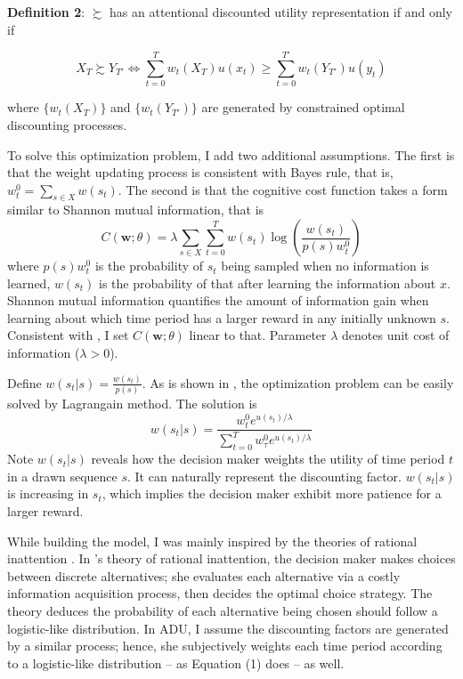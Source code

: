 \documentclass[
  12pt,
]{article}
\begin{document}
\textbf{Definition 2}: \(\succsim\) has an attentional discounted
utility representation if and only if

\[
X_T \succsim Y_{T'} \Longleftrightarrow \sum_{t=0}^{T} w_t(X_T)u(x_t)\geq \sum_{t=0}^{T'} w_t(Y_{T'})u(y_t)
\]

where \(\{w_t(X_T)\}\) and \(\{w_t(Y_{T'})\}\) are generated by
constrained optimal discounting processes.

To solve this optimization problem, I add two additional assumptions.
The first is that the weight updating process is consistent with Bayes
rule, that is, \(w^0_t=\sum_{s\in X} w(s_t)\). The second is that the
cognitive cost function takes a form similar to Shannon mutual
information, that is\[
C(\textbf{w};\theta)= \lambda \sum_{s\in X}\sum_{t=0}^T w(s_t) \log\left(\frac{w(s_t)}{p(s)w_t^0}\right)
\]where \(p(s)w^0_t\) is the probability of \(s_t\) being sampled when
no information is learned, \(w(s_t)\) is the probability of that after
learning the information about \(x\). Shannon mutual information
quantifies the amount of information gain when learning about which time
period has a larger reward in any initially unknown \(s\). Consistent
with \citet{matejka_rational_2015}, I set \(C(\textbf{w};\theta)\)
linear to that. Parameter \(\lambda\) denotes unit cost of information
(\(\lambda>0\)).

Define \(w(s_t|s) = \frac{w(s_t)}{p(s)}\). As is shown in
\citet{matejka_rational_2015}, the optimization problem can be easily
solved by Lagrangain method. The solution is\[ \tag{1}
w(s_t|s) =\frac{w_t^0e^{u(s_t)/\lambda}}{\sum_{t=0}^T w_\tau^0 e^{u(s_t)/\lambda}}
\]Note \(w(s_t|s)\) reveals how the decision maker weights the utility
of time period \(t\) in a drawn sequence \(s\). It can naturally
represent the discounting factor. \(w(s_t|s)\) is increasing in \(s_t\),
which implies the decision maker exhibit more patience for a larger
reward.

While building the model, I was mainly inspired by the theories of
rational inattention
\citep{matejka_rational_2015, jung_discrete_2019, mackowiak_rational_2023}.
In \citet{matejka_rational_2015}'s theory of rational inattention, the
decision maker makes choices between discrete alternatives; she
evaluates each alternative via a costly information acquisition process,
then decides the optimal choice strategy. The theory deduces the
probability of each alternative being chosen should follow a
logistic-like distribution. In ADU, I assume the discounting factors are
generated by a similar process; hence, she subjectively weights each
time period according to a logistic-like distribution -- as Equation (1)
does -- as well.
\end{document}
